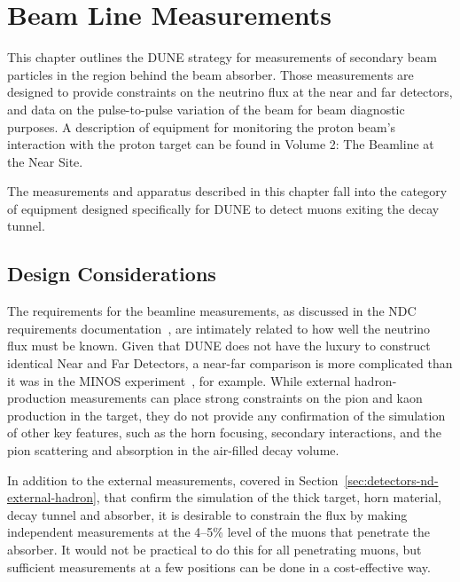 \section{Beam Line Measurements} 
\label{sec:detectors-nd-ref-blm}

This chapter outlines the DUNE strategy for measurements of secondary
beam particles in the region behind the beam absorber. 
Those measurements are designed to provide constraints 
on the neutrino flux at the near and far
detectors, and data on the pulse-to-pulse variation
of the beam for beam diagnostic purposes. A description of equipment
for monitoring the proton beam's interaction with the proton target
can be found in Volume 2: The Beamline at the Near Site. 

The measurements and apparatus described in this chapter fall into
the category of equipment designed specifically for DUNE to
detect muons exiting the decay tunnel. 

\subsection{Design Considerations}
\label{subsec:detectors-nd-blm-design}

The requirements for the beamline measurements, 
as discussed in the NDC requirements documentation~\cite{nd_requirements_doc}, 
are intimately related to how well the neutrino flux must be known. 
Given that DUNE does not have the luxury to construct identical 
Near and Far Detectors, a near-far comparison is more complicated than it was in
the MINOS experiment~\cite{gnumi-validation}, for example.   
While external hadron-production measurements can place strong 
constraints on the pion and kaon production in the target, they do not 
provide any confirmation of the simulation of other key features, such 
as the horn focusing, secondary interactions, and the 
pion scattering and absorption in the air-filled decay volume. 

In addition to the external measurements, covered in Section~\ref{sec:detectors-nd-external-hadron}, 
that confirm the simulation of the thick target, horn material, decay tunnel and
absorber, it is desirable to constrain the flux by making independent
measurements at the 4--5\% level of the muons that penetrate the absorber. It would not be practical to do this for all penetrating muons, but sufficient measurements at a few positions can be done in a  cost-effective way. 
%

